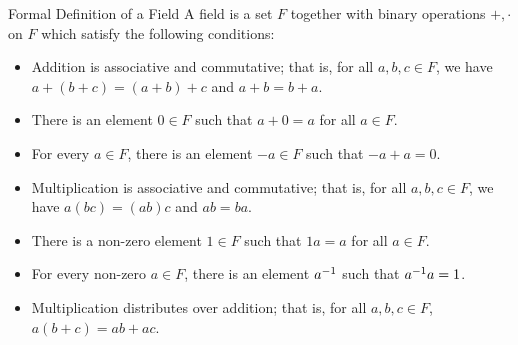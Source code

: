 \begin{edXshowhide}{Formal Definition of a Field}
A field is a set $F$ together with binary operations $+, \cdot$ on $F$ which satisfy the
following conditions:

\begin{itemize}
\item Addition is associative and commutative; that is, for all $a,b,c \in F$, we have
$a+(b+c) = (a+b)+c$ and $a+b  = b+a$.  
\item There is an element $0 \in F$ such that $a+0 = a$ for all $a \in F$.
\item For every $a\in F$, there is an element $-a \in F$ such that $-a + a = 0$.  
\item Multiplication is associative and commutative; that is, for all $a,b,c \in F$, we have
$a(bc) = (ab)c$ and $ab  = ba$.  
\item There is a non-zero element $1 \in F$ such that $1a = a$ for all $a \in F$.  
\item For every non-zero $a\in F$, there is an element $a^{-1}$ such that $a^{-1} a = 1$.  
\item Multiplication distributes over addition; that is, for all $a,b,c \in F$, $a(b+c) = ab + ac$.  
\end{itemize}

\end{edXshowhide}




\endedxtext

\endedxvertical
